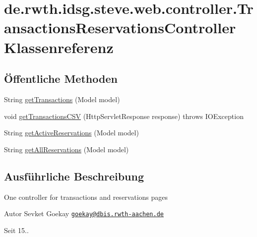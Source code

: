 \hypertarget{classde_1_1rwth_1_1idsg_1_1steve_1_1web_1_1controller_1_1_transactions_reservations_controller}{\section{de.\-rwth.\-idsg.\-steve.\-web.\-controller.\-Transactions\-Reservations\-Controller Klassenreferenz}
\label{classde_1_1rwth_1_1idsg_1_1steve_1_1web_1_1controller_1_1_transactions_reservations_controller}
}
\subsection*{Öffentliche Methoden}
\begin{DoxyCompactItemize}
\item 
String \hyperlink{classde_1_1rwth_1_1idsg_1_1steve_1_1web_1_1controller_1_1_transactions_reservations_controller_a42144a8bc58a5218fab8801fd51d8a84}{get\-Transactions} (Model model)
\item 
void \hyperlink{classde_1_1rwth_1_1idsg_1_1steve_1_1web_1_1controller_1_1_transactions_reservations_controller_a7e6bb9d495cc7fe061aa3e924c6181fa}{get\-Transactions\-C\-S\-V} (Http\-Servlet\-Response response)  throws I\-O\-Exception 
\item 
String \hyperlink{classde_1_1rwth_1_1idsg_1_1steve_1_1web_1_1controller_1_1_transactions_reservations_controller_ac9018121ea97f293a5e4ee45ee7f0695}{get\-Active\-Reservations} (Model model)
\item 
String \hyperlink{classde_1_1rwth_1_1idsg_1_1steve_1_1web_1_1controller_1_1_transactions_reservations_controller_ae9942e1a18148e137743a22105f6b336}{get\-All\-Reservations} (Model model)
\end{DoxyCompactItemize}


\subsection{Ausführliche Beschreibung}
One controller for transactions and reservations pages

\begin{DoxyAuthor}{Autor}
Sevket Goekay \href{mailto:goekay@dbis.rwth-aachen.de}{\tt goekay@dbis.\-rwth-\/aachen.\-de} 
\end{DoxyAuthor}
\begin{DoxySince}{Seit}
15.. 
\end{DoxySince}


